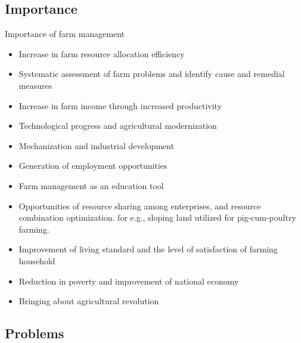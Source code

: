 \documentclass[12pt,ignorenonframetext,aspectratio=169]{beamer}
\providecommand{\tightlist}{%
  \setlength{\itemsep}{0pt}\setlength{\parskip}{0pt}}
\begin{document}
\hypertarget{importance}{%
\subsection{Importance}\label{importance}}

\begin{frame}{Importance of farm management}
\protect\hypertarget{importance-of-farm-management}{}
\begin{itemize}
\tightlist
\item
  Increase in farm resource allocation efficiency
\item
  Systematic assessment of farm problems and identify cause and remedial
  measures
\item
  Increase in farm income through increased productivity
\item
  Technological progress and agricultural modernization
\item
  Mechanization and industrial development
\item
  Generation of employment opportunities
\item
  Farm management as an education tool
\item
  Opportunities of resource sharing among enterprises, and resource
  combination optimization. for e.g., sloping land utilized for
  pig-cum-poultry farming.
\item
  Improvement of living standard and the level of satisfaction of
  farming household
\item
  Reduction in poverty and improvement of national economy
\item
  Bringing about agricultural revolution
\end{itemize}
\end{frame}

\hypertarget{problems}{%
\subsection{Problems}\label{problems}}
\end{document}
